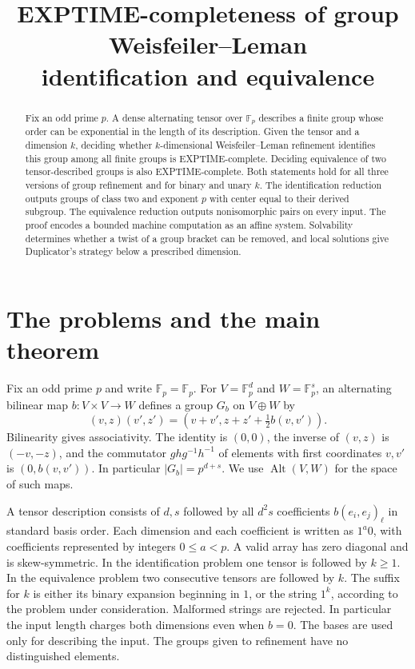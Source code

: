 \documentclass[11pt]{article}
\title{EXPTIME-completeness of group Weisfeiler--Leman\\
identification and equivalence}
\author{}
\date{}
\newcommand{\F}{\mathbb F_p}
\DeclareMathOperator{\Alt}{Alt}
\theoremstyle{definition}
\theoremstyle{remark}
\numberwithin{equation}{section}
\begin{document}
\maketitle
\vspace{-2em}
\begin{abstract}
Fix an odd prime $p$. A dense alternating tensor over $\mathbb F_p$ describes a
finite group whose order can be exponential in the length of its description.
Given the tensor and a dimension $k$, deciding whether $k$-dimensional
Weisfeiler--Leman refinement identifies this group among all finite groups
is EXPTIME-complete. Deciding equivalence of two tensor-described groups is
also EXPTIME-complete. Both statements hold for all three versions of group
refinement and for binary and unary $k$. The identification reduction outputs
groups of class two and exponent $p$ with center equal to their derived
subgroup. The equivalence reduction outputs nonisomorphic pairs on every
input. The proof encodes a bounded machine computation as an affine system.
Solvability determines whether a twist of a group bracket can be removed,
and local solutions give Duplicator's strategy below a prescribed dimension.
\end{abstract}

\section{The problems and the main theorem}
\label{sec:statement}
Fix an odd prime $p$ and write $\F=\mathbb F_p$.
For $V=\F^d$ and $W=\F^s$, an alternating bilinear map $b:V\times V\to W$
defines a group $G_b$ on $V\oplus W$ by
\begin{equation}
 (v,z)(v',z')=(v+v',z+z'+\tfrac12 b(v,v')).
 \label{eq:tensor-group}
\end{equation}
Bilinearity gives associativity. The identity is $(0,0)$, the inverse of
$(v,z)$ is $(-v,-z)$, and the commutator $ghg^{-1}h^{-1}$ of elements
with first coordinates $v,v'$ is $(0,b(v,v'))$. In particular
$|G_b|=p^{d+s}$. We use $\Alt(V,W)$ for the space of such maps.

A tensor description consists of $d,s$ followed by all $d^2s$
coefficients $b(e_i,e_j)_\ell$ in standard basis order. Each dimension
and each coefficient is written as $1^a0$, with coefficients represented
by integers $0\le a<p$. A valid array has zero diagonal and is
skew-symmetric. In the identification problem one tensor is followed by
$k\ge1$. In the equivalence problem two consecutive tensors are followed
by $k$. The suffix for $k$ is either its binary expansion beginning in
$1$, or the string $1^k$, according to the problem under consideration.
Malformed strings are rejected. In particular the input length charges
both dimensions even when $b=0$. The bases are used only for describing
the input. The groups given to refinement have no distinguished elements.
\end{document}
